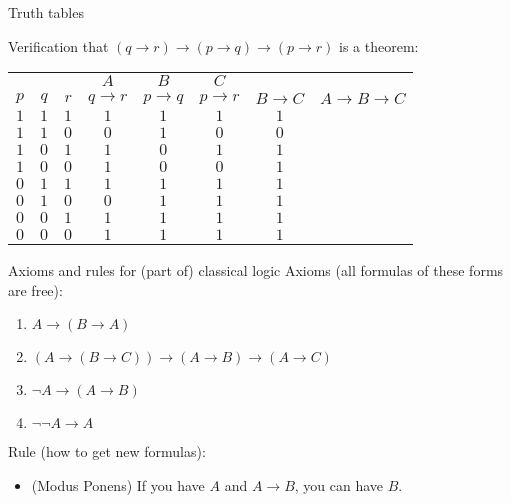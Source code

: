 \documentclass{beamer}
\begin{document}
\begin{frame}{Truth tables}

Verification that $(q\to r)\to (p\to q)\to (p\to r)$ is a theorem:

\vfill

\begin{tabular}{ccc|ccc|cc}
    & & & $A$ & $B$ & $C$ \\
$p$ & $q$ & $r$ & $q\to r$ & $p\to q$ & $p\to r$ & $B\to C$ & $A\to B\to C$ \\
\hline
$1$ & $1$ & $1$ & $1$ & $1$ & $1$ & $1$ & \color{blue}{$1$} \\
$1$ & $1$ & $0$ & $0$ & $1$ & $0$ & $0$ & \color{blue}{$1$} \\
$1$ & $0$ & $1$ & $1$ & $0$ & $1$ & $1$ & \color{blue}{$1$} \\
$1$ & $0$ & $0$ & $1$ & $0$ & $0$ & $1$ & \color{blue}{$1$} \\
$0$ & $1$ & $1$ & $1$ & $1$ & $1$ & $1$ & \color{blue}{$1$} \\
$0$ & $1$ & $0$ & $0$ & $1$ & $1$ & $1$ & \color{blue}{$1$} \\
$0$ & $0$ & $1$ & $1$ & $1$ & $1$ & $1$ & \color{blue}{$1$} \\
$0$ & $0$ & $0$ & $1$ & $1$ & $1$ & $1$ & \color{blue}{$1$}
\end{tabular}

\end{frame}

\begin{frame}{Axioms and rules for (part of) classical logic}
Axioms (all formulas of these forms are free):
\begin{enumerate}
\item $A\to(B\to A)$
\item $(A\to (B\to C)) \to (A\to B) \to (A\to C)$
\item $\neg A\to (A\to B)$
\item $\neg\neg A\to A$
\end{enumerate}
\vfill
Rule (how to get new formulas):
\begin{itemize}
\item (Modus Ponens) If you have $A$ and $A\to B$, you can have $B$.
\end{itemize}
\vfill
\end{frame}
\end{document}
